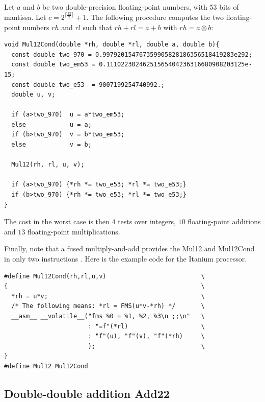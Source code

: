 \begin{theorem}
  Let $a$ and $b$ be two double-precision floating-point numbers, with
  53 bits of mantissa. Let $c=2^{\lceil\frac{ 53 }{2}\rceil}+1$.
  The following procedure
  computes the two floating-point numbers $rh$ and $rl$ such that $rh
  + rl = a + b$ with $rh = a \otimes b$:

\begin{lstlisting}[label={lst:Mul12Cond},caption={Mul12Cond},firstnumber=1]
void Mul12Cond(double *rh, double *rl, double a, double b){
  const double two_970 = 0.997920154767359905828186356518419283e292;
  const double two_em53 = 0.11102230246251565404236316680908203125e-15;
  const double two_e53  = 9007199254740992.;
  double u, v;

  if (a>two_970)  u = a*two_em53; 
  else            u = a;
  if (b>two_970)  v = b*two_em53; 
  else            v = b;

  Mul12(rh, rl, u, v);

  if (a>two_970) {*rh *= two_e53; *rl *= two_e53;} 
  if (b>two_970) {*rh *= two_e53; *rl *= two_e53;} 
}\end{lstlisting}
\end{theorem}

The cost in the worst case is then $4$ tests over integers,
$10$ floating-point additions and $13$ floating-point multiplications.


Finally, note that a fused multiply-and-add provides the Mul12 and
Mul12Cond in only two instructions \cite{CorneaHarrisonTang2002}. Here
is the example code for the Itanium processor.

\begin{lstlisting}[label={lst:Mul12CondFMA},caption={Mul12 on the Itanium},firstnumber=1]
#define Mul12Cond(rh,rl,u,v)                          \
{                                                     \
  *rh = u*v;                                          \
  /* The following means: *rl = FMS(u*v-*rh) */       \
  __asm__ __volatile__("fms %0 = %1, %2, %3\n ;;\n"   \
                       : "=f"(*rl)                    \
                       : "f"(u), "f"(v), "f"(*rh)     \
                       );                             \
}
#define Mul12 Mul12Cond
\end{lstlisting}





\subsection{Double-double addition {Add22}}
  
